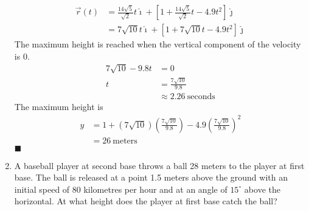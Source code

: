 \begin{enumerate}
          \begin{align*}
              \vec{r}(t) & = \frac{14\sqrt{5}}{\sqrt{2}} t\hat{\imath} + \left[1 + \frac{14\sqrt{5}}{\sqrt{2}} t - 4.9t^2\right]\hat{\jmath} \\
                         & = 7\sqrt{10} t\hat{\imath} + \left[1 + 7\sqrt{10} t - 4.9t^2\right]\hat{\jmath}
          \end{align*}
          The maximum height is reached when the vertical component of the velocity is $0$.
          \begin{align*}
              7\sqrt{10} - 9.8t & = 0                          \\
              t                 & = \frac{7\sqrt{10}}{9.8}     \\
                                & \approx 2.26\ \text{seconds}
          \end{align*}
          The maximum height is
          \begin{align*}
              y & = 1 + (7\sqrt{10})\left(\frac{7\sqrt{10}}{9.8}\right) - 4.9\left(\frac{7\sqrt{10}}{9.8}\right)^2 \\
                & = 26\ \text{meters}
          \end{align*} \hfill$\blacksquare$

    \item A baseball player at second base throws a ball 28 meters to the player at first
          base. The ball is released at a point 1.5 meters above the ground with an
          initial speed of 80 kilometres per hour and at an angle of $15^{\circ}$ above
          the horizontal. At what height does the player at first base catch the ball?


\end{enumerate}
